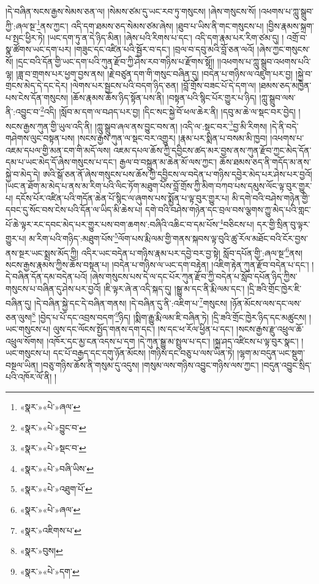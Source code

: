 །དེ་བཞིན་སངས་རྒྱས་སེམས་ཅན་ལ། །སེམས་ཙམ་དུ་ཡང་རབ་ཏུ་གསུངས། །ཞེས་གསུངས་སོ། །འཕགས་པ་ཀླུ་སྒྲུབ་ཀྱི་:ཞལ་སྔ་\footnote{«སྣར་»«པེ་»ཞལ་}ནས་ཀྱང་། འདི་དག་ཐམས་ཅད་སེམས་ཙམ་ཞེས། །ཐུབ་པ་ཡིས་ནི་གང་གསུངས་པ། །བྱིས་རྣམས་སྐྲག་པ་སྤང་ཕྱིར་ཏེ། །ཡང་དག་ཏུ་ན་དེ་ཉིད་མིན། །ཞེས་པའི་རིགས་པ་དང་། འདི་དག་རྣམ་པར་རིག་ཙམ་དུ། །
འགྲོ་བ་སྣ་ཚོགས་ཡང་དག་པར། །གཟུང་དང་འཛིན་པའི་སྦྱོར་བ་དང་། །བྲལ་བ་དབུ་མའི་བློ་ཅན་ལའོ། །ཞེས་ཀྱང་གསུངས་སོ། །དྲང་བའི་དོན་གྱི་ཡང་དག་པའི་ཀུན་རྫོབ་ཀྱི་ཤེས་རབ་གཉིས་པ་རྫོགས་སྷོ།། །།འཕགས་པ་ཀླུ་སྒྲུབ་འཕགས་པའི་ལྷ། །ཟླ་བ་གྲགས་པར་ཕྱག་བྱས་ནས། །རྗེ་བཙུན་དག་གི་གསུང་བཞིན་དུ། །བདེན་པ་གཉིས་ལ་འཇུག་པར་བྱ། །སྐྱེ་བ་གྲངས་མེད་དེ་དང་དེར། །ལེགས་པར་སྦྱངས་པའི་བདག་ཉིད་ཅན། །བློ་གྲོས་བཟང་པོ་དེ་དག་ལ། །ཐམས་ཅད་མཁྱེན་པས་ངེས་དོན་གསུངས། །ཆོས་རྣམས་ཆོས་ཉིད་སྟོན་པས་ནི། །བསྟན་པའི་སྙིང་པོར་གྱུར་པ་ཉིད། །ཀླུ་སྒྲུབ་ལས་ནི་:འབྱུང་བ་\footnote{«སྣར་»«པེ་»བྱུང་བ་}འདི། །སློབ་མ་དག་ལ་བཤད་པར་བྱ། །དིང་སང་སྐྱེ་བོ་ཕལ་ཆེར་ནི། །དབུ་མ་ཆེ་ལ་སྡང་བར་བྱེད། །སངས་རྒྱས་ཀུན་གྱི་ཡུལ་འདི་ནི། །ཀླུ་སྒྲུབ་ཞལ་ནས་བྱུང་བས་ན། །འདི་ལ་:སྡང་བར་\footnote{«སྣར་»«པེ་»སྡང་བ་}བྱ་མི་རིགས། །དེ་ནི་བདེ་གཤེགས་ལུང་བསྟན་པས། །སངས་རྒྱས་ཀུན་ལ་སྡང་བར་འགྱུར། །རྣམ་པར་སྨིན་པ་བསམ་མི་ཁྱབ། །འཕགས་པ་འཇམ་དཔལ་གྱི་མན་ངག་གི་མདོ་ལས། འཇམ་དཔལ་ཆོས་ཀྱི་དབྱིངས་ཚད་མར་བྱས་ནས་ཀུན་རྫོབ་ཀྱང་མེད་དོན་དམ་པ་ཡང་མེད་དོ་ཞེས་གསུངས་པ་དང་། རྒྱལ་བ་བསྐྲུན་མ་ཆེན་མོ་ལས་ཀྱང་། ཆོས་ཐམས་ཅད་ནི་གདོད་མ་ནས་སྐྱེ་བ་མེད་དེ། ཨའི་སྒོ་ཅན་ནོ་ཞེས་གསུངས་པས་ཆོས་ཀྱི་དབྱིངས་ལ་བདེན་པ་གཉིས་དབྱེར་མེད་པར་ཤེས་པར་བྱའོ། །ཡང་ན་ཐོག་མ་མེད་པ་ནས་མ་རིག་པའི་ལིང་ཏོག་མཐུག་པོས་བློ་གྲོས་ཀྱི་མིག་བཀབ་པས་དམུས་ལོང་ལྟ་བུར་གྱུར་པ། དངོས་པོར་འཛིན་པའི་གདོན་ཆེན་པོ་སྙིང་ལ་ཞུགས་པས་སྨྱོན་པ་ལྟ་བུར་གྱུར་པ། མི་དགེ་བའི་བཤེས་གཉེན་གྱི་དབང་དུ་སོང་བས་ངེས་པའི་དོན་ལ་ཡིད་མི་ཆེས་པ། དགེ་བའི་བཤེས་གཉེན་དང་བྲལ་བས་ལྕགས་ཀྱུ་མེད་པའི་གླང་པོ་ཆེ་ལྟར་རང་དབང་མེད་པར་གྱུར་པས་བག་ཆགས་:བཞིའི་འཆིང་བ་དམ་པོས་\footnote{«སྣར་»«པེ་»བཞི་ཡིས་}བཅིངས་པ། དར་གྱི་སྲིན་བུ་ལྟར་གྱུར་པ། མ་རིག་པའི་གཉིད་:མཐུག་པོས་\footnote{«སྣར་»«པེ་»འཐུག་པོ་}ལོག་པས་རྨི་ལམ་གྱི་གནས་སྐབས་ལྟ་བུའི་ཚུ་རོལ་མཐོང་བའི་ངོར་བྱས་ནས་སྔར་ཡང་སྨྲས་མོད་ཀྱི། འདིར་ཡང་བདེན་པ་གཉིས་རྣམ་པར་དབྱེ་བར་བྱ་སྟེ། སློབ་དཔོན་གྱི་:ཞལ་སྔ་\footnote{«སྣར་»«པེ་»ཞལ་}ནས། སངས་རྒྱས་རྣམས་ཀྱིས་ཆོས་བསྟན་པ། །བདེན་པ་གཉིས་ལ་ཡང་དག་བརྟེན། །འཇིག་རྟེན་ཀུན་རྫོབ་བདེན་པ་དང་། །དེ་བཞིན་དོན་དམ་བདེན་པའོ། །ཞེས་གསུངས་པས་དེ་ལ་དང་པོར་ཀུན་རྫོབ་ཀྱི་བདེན་པ་སློབ་དཔོན་ཉིད་ཀྱིས་གསུངས་པ་བཞིན་དུ་ཤེས་པར་བྱའོ། །ཇི་ལྟར་ཞེ་ན་འདི་སྐད་དུ། །སྒྱུ་མ་དང་ནི་རྨི་ལམ་དང་། །དྲི་ཟའི་གྲོང་ཁྱེར་ཇི་བཞིན་དུ། །དེ་བཞིན་སྐྱེ་དང་དེ་བཞིན་གནས། །དེ་བཞིན་དུ་ནི་:འཇིག་པ་\footnote{«སྣར་»འཇིགས་པ་}གསུངས། །ཉོན་མོངས་ལས་དང་ལས་ཅན་ལུས།\footnote{«སྣར་»བུས།} །བྱེད་པ་པོ་དང་འབྲས་བདག་\footnote{«སྣར་»«པེ་»དག་}ཉིད། །སྨིག་རྒྱུ་རྨི་ལམ་ཇི་བཞིན་ཏེ། །དྲི་ཟའི་གྲོང་ཁྱེར་ཉིད་དང་མཚུངས། །ཡང་གསུངས་པ། ལུས་དང་ལོངས་སྤྱོད་གནས་དག་དང་། །ས་དང་ཕ་རོལ་ཕྱིན་པ་དང་། །སངས་རྒྱས་རྫུ་འཕྲུལ་ཆོ་འཕྲུལ་སོགས། །འཁོར་དང་མྱ་ངན་འདས་པ་དག །དེ་ཀུན་སྒྱུ་མ་སྤྲུལ་པ་དང་། །སྐྲ་ཤད་འཛིངས་པ་ལྟ་བུར་སྣང་། །ཡང་གསུངས་པ། དང་པོ་བརྒྱད་དང་དགུ་ཉོན་མོངས། །གཉིས་དང་བཅུ་པ་ལས་ཡིན་ཏེ། །ལྷག་མ་བདུན་ཡང་སྡུག་བསྔལ་ཡིན། །བཅུ་གཉིས་ཆོས་ནི་གསུམ་དུ་འདུས། །གསུམ་ལས་གཉིས་འབྱུང་གཉིས་ལས་ཀྱང་། །བདུན་འབྱུང་སྲིད་པའི་འཁོར་ལོ་ནི། །
